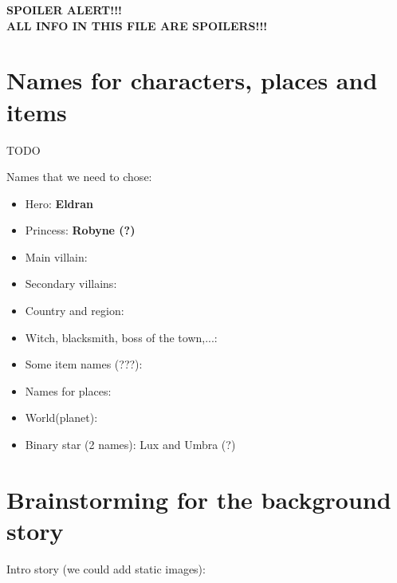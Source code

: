 \documentclass[12pt,a4paper]{report}
\begin{document}

{\Huge\textbf{\color{red}
SPOILER ALERT!!! \\[1cm]
ALL INFO IN THIS FILE ARE SPOILERS!!!
}}

\section{Names for characters, places and items}
TODO

Names that we need to chose:
\begin{itemize}
\item Hero: \textbf{Eldran}
\item Princess: \textbf{Robyne (?)}
\item Main villain:
\item Secondary villains:
\item Country and region:
\item Witch, blacksmith, boss of the town,...:
\item Some item names (???):
\item Names for places:
\item World(planet):
\item Binary star (2 names): Lux and Umbra (?)
\end{itemize}

\section{Brainstorming for the background story}

Intro story (we could add static images):
\end{document}
